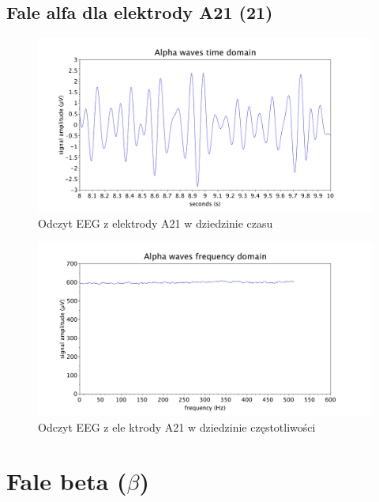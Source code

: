 \documentclass{article}
\begin{document}
    \subsection{Fale alfa dla elektrody A21 (21)}
    \begin{figure}[H]
        \hspace*{-1.5cm} 
        \includegraphics[width=\linewidth+3cm]{alpha_time.pdf}
        \caption{Odczyt EEG z elektrody A21 w dziedzinie czasu}
    \end{figure}
    \begin{figure}[H]
        \hspace*{-1.5cm}
        \includegraphics[width=\linewidth+3cm]{alpha_freq.pdf}
        \caption{Odczyt EEG z ele ktrody A21 w dziedzinie częstotliwości}
    \end{figure}

\newpage
\section{Fale beta ($\beta$)}
\end{document}
